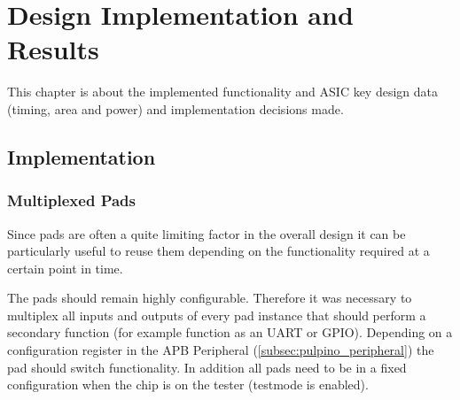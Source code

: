 

\chapter{Design Implementation and Results}

This chapter is about the implemented functionality and ASIC key design data (timing, area and power) and implementation decisions made.

\section{Implementation}

\subsection{Multiplexed Pads}

Since pads are often a quite limiting factor in the overall design it can be particularly useful to reuse them depending on the functionality required at a certain point in time.

The pads should remain highly configurable. Therefore it was necessary to multiplex all inputs and outputs of every pad instance that should perform a secondary function (for example function as an UART or GPIO). Depending on a configuration register in the APB \pulpino Peripheral (\ref{subsec:pulpino_peripheral}) the pad should switch functionality. In addition all pads need to be in a fixed configuration when the chip is on the tester (testmode is enabled).

